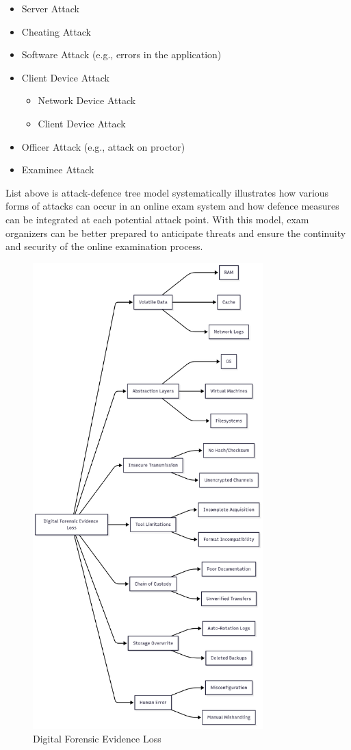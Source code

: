 \begin{itemize}
	\item Server Attack
	\item Cheating Attack
	\item Software Attack (e.g., errors in the application)
	\item Client Device Attack
	\begin{itemize}
		\item Network Device Attack
		\item Client Device Attack
	\end{itemize}
	\item Officer Attack (e.g., attack on proctor)
	\item Examinee Attack
\end{itemize}
List above \citet{rosmansyah2019attackdefensetreeonaeexamsystem} is attack-defence tree model systematically illustrates how various forms of attacks can occur in an online exam system and how defence measures can be integrated at each potential attack point. With this model, exam organizers can be better prepared to anticipate threats and ensure the continuity and security of the online examination process.
\begin{figure}[H] 
	\centering
	\includegraphics[height=18cm]{figure/df-evidence-loss.png}
	\caption{Digital Forensic Evidence Loss \cite{larchenko2025mindmap}}
	\label{fig:df-evidence-loss}
\end{figure}

